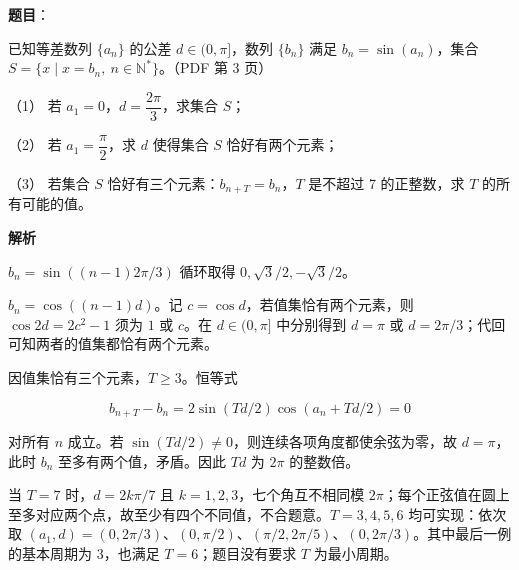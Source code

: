 \begin{answer}

\textbf{题目}：

已知等差数列 $\{a_n\}$ 的公差 $d\in(0,\pi]$，数列 $\{b_n\}$ 满足 $b_n=\sin(a_n)$，集合 $S=\{x\mid x=b_n,\ n\in\mathbb N^*\}$。（PDF 第 3 页）

（1） 若 $a_1=0$，$d=\dfrac{2\pi}{3}$，求集合 $S$；

（2） 若 $a_1=\dfrac\pi2$，求 $d$ 使得集合 $S$ 恰好有两个元素；

（3） 若集合 $S$ 恰好有三个元素：$b_{n+T}=b_n$，$T$ 是不超过 7 的正整数，求 $T$ 的所有可能的值。

\textbf{解析}


$b_n=\sin((n-1)2\pi/3)$ 循环取得 $0,\sqrt3/2,-\sqrt3/2$。


$b_n=\cos((n-1)d)$。记 $c=\cos d$，若值集恰有两个元素，则 $\cos2d=2c^2-1$ 须为 $1$ 或 $c$。在 $d\in(0,\pi]$ 中分别得到 $d=\pi$ 或 $d=2\pi/3$；代回可知两者的值集都恰有两个元素。


因值集恰有三个元素，$T\ge3$。恒等式

\nopagebreak[4]
\[
b_{n+T}-b_n=2\sin(Td/2)\cos(a_n+Td/2)=0
\]

对所有 $n$ 成立。若 $\sin(Td/2)\ne0$，则连续各项角度都使余弦为零，故 $d=\pi$，此时 $b_n$ 至多有两个值，矛盾。因此 $Td$ 为 $2\pi$ 的整数倍。

当 $T=7$ 时，$d=2k\pi/7$ 且 $k=1,2,3$，七个角互不相同模 $2\pi$；每个正弦值在圆上至多对应两个点，故至少有四个不同值，不合题意。$T=3,4,5,6$ 均可实现：依次取 $(a_1,d)=(0,2\pi/3)$、$(0,\pi/2)$、$(\pi/2,2\pi/5)$、$(0,2\pi/3)$。其中最后一例的基本周期为 $3$，也满足 $T=6$；题目没有要求 $T$ 为最小周期。




\end{answer}
